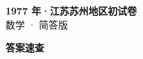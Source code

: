 \documentclass[zihao=-4, a4paper]{ctexart}
\begin{document}
\begin{center}
  {\Large\bfseries 1977 年·江苏苏州地区初试卷}\\[4pt]
  {\large 数学 · 简答版}
\end{center}
\medskip
{}

\clearpage
{}
\begin{center}{\Large\bfseries 答案速查}\end{center}
\medskip

\end{document}
